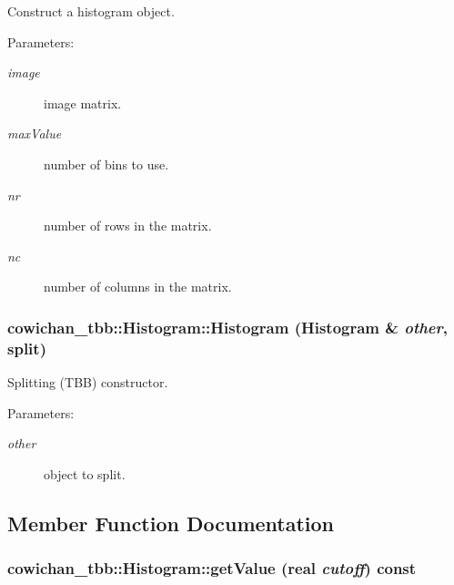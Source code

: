 Construct a histogram object. \begin{Desc}
\item[Parameters:]
\begin{description}
\item[{\em image}]image matrix. \item[{\em maxValue}]number of bins to use. \item[{\em nr}]number of rows in the matrix. \item[{\em nc}]number of columns in the matrix. \end{description}
\end{Desc}
\hypertarget{classcowichan__tbb_1_1_histogram_67d7da06d8e4390c3a1189f6e437513d}{
\subsubsection[{Histogram}]{\setlength{\rightskip}{0pt plus 5cm}cowichan\_\-tbb::Histogram::Histogram ({\bf Histogram} \& {\em other}, \/  split)}}
\label{classcowichan__tbb_1_1_histogram_67d7da06d8e4390c3a1189f6e437513d}


Splitting (TBB) constructor. \begin{Desc}
\item[Parameters:]
\begin{description}
\item[{\em other}]object to split. \end{description}
\end{Desc}


\subsection{Member Function Documentation}
\hypertarget{classcowichan__tbb_1_1_histogram_0eb04715e3b5fb8b18fe73220aad5f34}{
\subsubsection[{getValue}]{ cowichan\_\-tbb::Histogram::getValue ({\bf real} {\em cutoff}) const}}
\label{classcowichan__tbb_1_1_histogram_0eb04715e3b5fb8b18fe73220aad5f34}



